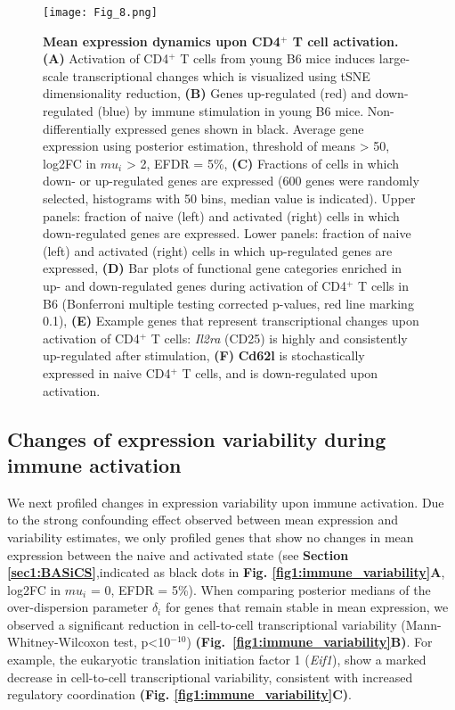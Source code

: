 \begin{figure}[!ht]
\centering
\texttt{[image: Fig\_8.png]}
\caption[Mean expression dynamics upon CD4$^+$ T cell activation]{\textbf{Mean expression dynamics upon CD4$^+$ T cell activation.}\\
\textbf{(A)} Activation of CD4$^+$ T cells from young B6 mice induces large-scale transcriptional changes which is visualized using tSNE dimensionality reduction, \textbf{(B)} Genes up-regulated (red) and down-regulated (blue) by immune stimulation in young B6 mice. Non-differentially expressed genes shown in black. Average gene expression using posterior estimation, threshold of means > 50, log2FC in $mu_i$ > 2, EFDR = 5\%, \textbf{(C)} Fractions of cells in which down- or up-regulated genes are expressed (600 genes were randomly selected, histograms with 50 bins, median value is indicated). Upper panels: fraction of naive (left) and activated (right) cells in which down-regulated genes are expressed. Lower panels: fraction of naive (left) and activated (right) cells in which up-regulated genes are expressed, \textbf{(D)} Bar plots of functional gene categories enriched in up- and down-regulated genes during activation of CD4$^+$ T cells in B6 (Bonferroni multiple testing corrected p-values, red line marking 0.1), \textbf{(E)} Example genes that represent transcriptional changes upon activation of CD4$^+$ T cells: \textit{Il2ra} (CD25) is highly and consistently up-regulated after stimulation, \textbf{(F)} \textbf{Cd62l} is stochastically expressed in naive CD4$^+$ T cells, and is down-regulated upon activation.
}
\label{fig1:immune_activation}
\end{figure}

\newpage

\subsection{Changes of expression variability during immune activation}

We next profiled changes in expression variability upon immune activation. Due to the strong confounding effect observed between mean expression and variability estimates, we only profiled genes that show no changes in mean expression between the naive and activated state (see \textbf{Section \ref{sec1:BASiCS}},indicated as black dots in \textbf{Fig. \ref{fig1:immune_variability}A}, log2FC in $mu_i$ = 0, EFDR = 5\%). When comparing posterior medians of the over-dispersion parameter $\delta_i$ for genes that remain stable in mean expression, we observed a significant reduction in cell-to-cell transcriptional variability (Mann-Whitney-Wilcoxon test, p<10$^{-10}$) \textbf{(Fig.~\ref{fig1:immune_variability}B)}. For example, the eukaryotic translation initiation factor 1 (\textit{Eif1}), show a marked decrease in cell-to-cell transcriptional variability, consistent with increased regulatory coordination \textbf{(Fig. \ref{fig1:immune_variability}C)}.\\

